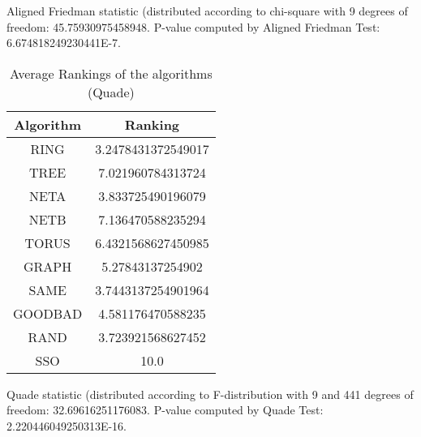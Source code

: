 \documentclass[a4paper,10pt]{article}
\begin{document}
\begin{landscape}
Aligned Friedman statistic (distributed according to chi-square with 9 degrees of freedom: 45.75930975458948. 
P-value computed by Aligned Friedman Test: 6.674818249230441E-7.\newline


\newpage

\begin{table}[!htp]
\centering
\caption{Average Rankings of the algorithms (Quade)
}\begin{tabular}{c|c}
Algorithm&Ranking\\
\hline
 RING&3.2478431372549017\\
 TREE&7.021960784313724\\
 NETA&3.833725490196079\\
 NETB&7.136470588235294\\
 TORUS&6.4321568627450985\\
 GRAPH&5.27843137254902\\
 SAME&3.7443137254901964\\
 GOODBAD&4.581176470588235\\
 RAND&3.723921568627452\\
 SSO&10.0\\
\end{tabular}
\end{table}
Quade statistic (distributed according to F-distribution with 9 and 441 degrees of freedom: 32.69616251176083. 
P-value computed by Quade Test: 2.220446049250313E-16.\newline


\newpage


\end{landscape}
\end{document}
